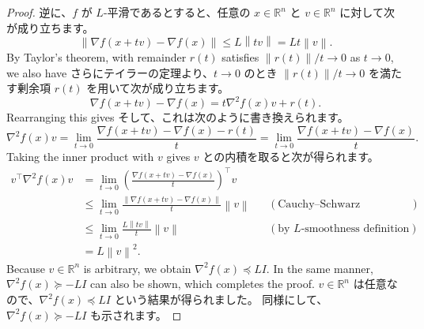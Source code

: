 \documentclass[0_main]{subfiles}
\begin{document}
\begin{proof}
        逆に、$f$ が $L$-平滑であるとすると、任意の $x \in \mathbb{R}^n$ と $v \in \mathbb{R}^n$ に対して次が成り立ちます。
    \fi
    \begin{equation*}
        \left\lVert \nabla f(x+tv)-\nabla f(x) \right\rVert \le L\left\lVert tv \right\rVert = Lt\left\lVert v \right\rVert.
    \end{equation*}
    \ifEn
        By Taylor's theorem, with remainder $r(t)$ satisfies $\left\lVert r(t) \right\rVert/t \to 0$ as $t \to 0$, we also have
    \else
        さらにテイラーの定理より、$t \to 0$ のとき $\left\lVert r(t) \right\rVert/t \to 0$ を満たす剰余項 $r(t)$ を用いて次が成り立ちます。
    \fi
    \begin{equation*}
        \nabla f(x+tv)-\nabla f(x) = t \nabla^2 f(x) v + r(t).
    \end{equation*}
    \ifEn
        Rearranging this gives
    \else
        そして、これは次のように書き換えられます。
    \fi
    \begin{equation*}
        \nabla^2 f(x) v = \lim_{t \to 0} \frac{\nabla f(x+tv)-\nabla f(x) -r(t)}{t} = \lim_{t \to 0} \frac{\nabla f(x+tv)-\nabla f(x)}{t}.
    \end{equation*}
    \ifEn
        Taking the inner product with $v$ gives
    \else
        $v$ との内積を取ると次が得られます。
    \fi
    \begin{align*}
        v^\top \nabla^2 f(x) v & = \lim_{t \to 0} \left(\frac{\nabla f(x+tv)-\nabla f(x)}{t}\right)^\top v                                                                               \\
                               & \leq \lim_{t \to 0} \frac{\left\lVert \nabla f(x+tv)-\nabla f(x) \right\rVert}{t} \left\lVert v \right\rVert &  & (\text{Cauchy--Schwarz inequality})   \\
                               & \leq \lim_{t \to 0} \frac{L\left\lVert tv \right\rVert}{t} \left\lVert v \right\rVert                        &  & (\text{by $L$-smoothness definition}) \\
                               & = L \left\lVert v \right\rVert^2.
    \end{align*}
    \ifEn
        Because $v \in \mathbb{R}^n$ is arbitrary, we obtain $\nabla^2 f(x)\preceq L I$.
        In the same manner, $\nabla^2 f(x)\succeq -L I$ can also be shown, which completes the proof.
    \else
        $v \in \mathbb{R}^n$ は任意なので、$\nabla^2 f(x)\preceq L I$ という結果が得られました。
        同様にして、$\nabla^2 f(x)\succeq -L I$ も示されます。
    \fi
    \myQED
\end{proof}
\end{document}
